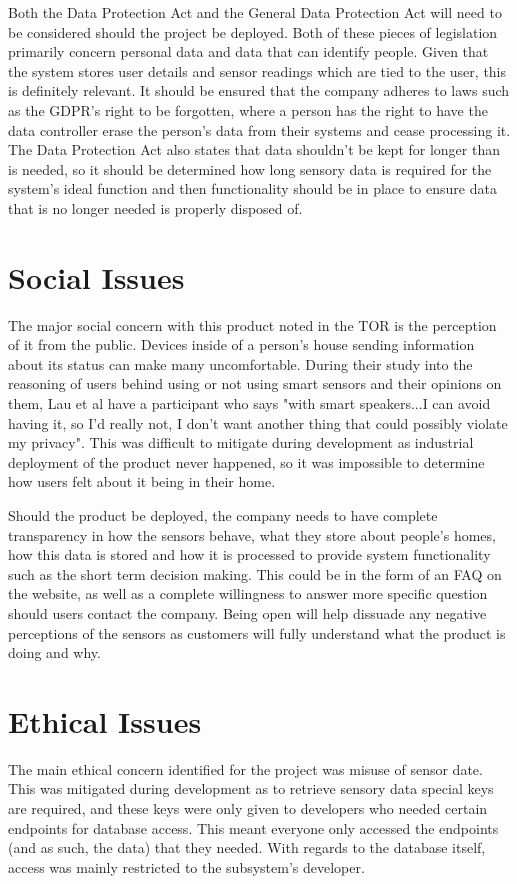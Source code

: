 \documentclass[]{report}
\begin{document}
Both the Data Protection Act\cite{dataprotectionact2018} and the General Data Protection Act\cite{gdpr} will need to be considered should the project be deployed. Both of these pieces of legislation primarily concern personal data and data that can identify people. Given that the system stores user details and sensor readings which are tied to the user, this is definitely relevant. It should be ensured that the company adheres to laws such as the GDPR's right to be forgotten, where a person has the right to have the data controller erase the person's data from their systems and cease processing it. The Data Protection Act also states that data shouldn't be kept for longer than is needed, so it should be determined how long sensory data is required for the system's ideal function and then functionality should be in place to ensure data that is no longer needed is properly disposed of.

\section{Social Issues}
The major social concern with this product noted in the TOR is the perception of it from the public. Devices inside of a person's house sending information about its status can make many uncomfortable. During their study into the reasoning of users behind using or not using smart sensors and their opinions on them, Lau et al\cite{lau2018alexa} have a participant who says "with smart speakers...I can avoid having it, so I’d really not, I don’t want another thing that could possibly violate my privacy". This was difficult to mitigate during development as industrial deployment of the product never happened, so it was impossible to determine how users felt about it being in their home.
\medskip

Should the product be deployed, the company needs to have complete transparency in how the sensors behave, what they store about people's homes, how this data is stored and how it is processed to provide system functionality such as the short term decision making. This could be in the form of an FAQ on the website, as well as a complete willingness to answer more specific question should users contact the company. Being open will help dissuade any negative perceptions of the sensors as customers will fully understand what the product is doing and why.

\section{Ethical Issues}
The main ethical concern identified for the project was misuse of sensor date. This was mitigated during development as to retrieve sensory data special keys are required, and these keys were only given to developers who needed certain endpoints for database access. This meant everyone only accessed the endpoints (and as such, the data) that they needed. With regards to the database itself, access was mainly restricted to the subsystem's developer.
\medskip
\end{document}
